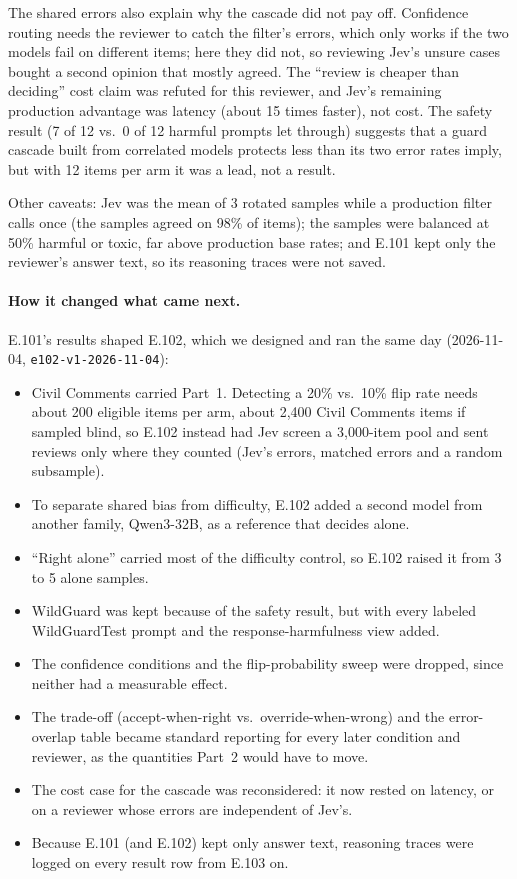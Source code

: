 \documentclass[11pt]{article}
\renewcommand{\_}{\origunderscore\allowbreak}
\begin{document}
The shared errors also explain why the cascade did not pay off. Confidence routing needs the reviewer to catch the filter's errors, which only works if the two models fail on different items; here they did not, so reviewing Jev's unsure cases bought a second opinion that mostly agreed. The ``review is cheaper than deciding'' cost claim was refuted for this reviewer, and Jev's remaining production advantage was latency (about 15 times faster), not cost. The safety result (7 of 12 vs.\ 0 of 12 harmful prompts let through) suggests that a guard cascade built from correlated models protects less than its two error rates imply, but with 12 items per arm it was a lead, not a result.

Other caveats: Jev was the mean of 3 rotated samples while a production filter calls once (the samples agreed on 98\% of items); the samples were balanced at 50\% harmful or toxic, far above production base rates; and E.101 kept only the reviewer's answer text, so its reasoning traces were not saved.

\paragraph{How it changed what came next.}
E.101's results shaped E.102, which we designed and ran the same day (2026-11-04, \texttt{e102-v1-2026-11-04}):
\begin{itemize}[nosep]
  \item Civil Comments carried Part~1. Detecting a 20\% vs.\ 10\% flip rate needs about 200 eligible items per arm, about 2,400 Civil Comments items if sampled blind, so E.102 instead had Jev screen a 3,000-item pool and sent reviews only where they counted (Jev's errors, matched errors and a random subsample).
  \item To separate shared bias from difficulty, E.102 added a second model from another family, Qwen3-32B, as a reference that decides alone.
  \item ``Right alone'' carried most of the difficulty control, so E.102 raised it from 3 to 5 alone samples.
  \item WildGuard was kept because of the safety result, but with every labeled WildGuardTest prompt and the response-harmfulness view added.
  \item The confidence conditions and the flip-probability sweep were dropped, since neither had a measurable effect.
  \item The trade-off (accept-when-right vs.\ override-when-wrong) and the error-overlap table became standard reporting for every later condition and reviewer, as the quantities Part~2 would have to move.
  \item The cost case for the cascade was reconsidered: it now rested on latency, or on a reviewer whose errors are independent of Jev's.
  \item Because E.101 (and E.102) kept only answer text, reasoning traces were logged on every result row from E.103 on.
\end{itemize}
\end{document}
